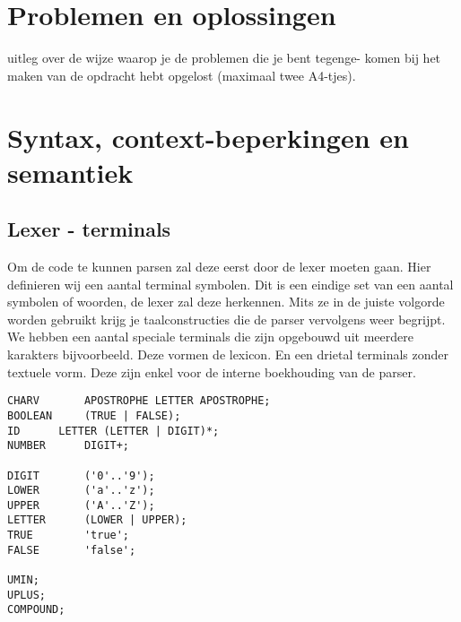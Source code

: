 \documentclass[]{article}
\begin{document}
\newpage
\section{Problemen en oplossingen}
uitleg over de wijze waarop je de problemen die je bent tegenge-
komen bij het maken van de opdracht hebt opgelost (maximaal twee A4-tjes).

\newpage
\section{Syntax, context-beperkingen en semantiek}


\subsection{Lexer - terminals}
Om de code te kunnen parsen zal deze eerst door de lexer moeten gaan. Hier definieren wij een aantal terminal symbolen. Dit is een eindige set van een aantal symbolen of woorden, de lexer zal deze herkennen. Mits ze in de juiste volgorde worden gebruikt krijg je taalconstructies die de parser vervolgens weer begrijpt. We hebben een aantal speciale terminals die zijn opgebouwd uit meerdere karakters bijvoorbeeld. Deze vormen de lexicon. En een drietal terminals zonder textuele vorm. Deze zijn enkel voor de interne boekhouding van de parser.
\\
\begin{lstlisting}[style=ANTLR]
CHARV		APOSTROPHE LETTER APOSTROPHE;
BOOLEAN		(TRUE | FALSE);
ID		LETTER (LETTER | DIGIT)*;
NUMBER		DIGIT+;
	
DIGIT		('0'..'9');
LOWER		('a'..'z');
UPPER		('A'..'Z');
LETTER		(LOWER | UPPER);
TRUE		'true';
FALSE		'false';

UMIN;
UPLUS;
COMPOUND;			
\end{lstlisting}

\newpage 
\end{document}
